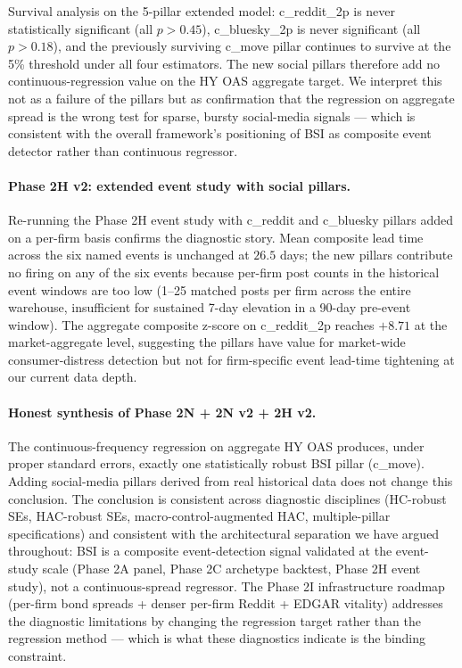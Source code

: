 \documentclass[11pt,a4paper]{article}
\begin{document}
Survival analysis on the 5-pillar extended model: c\_reddit\_2p is never statistically significant (all $p > 0.45$), c\_bluesky\_2p is never significant (all $p > 0.18$), and the previously surviving c\_move pillar continues to survive at the 5\% threshold under all four estimators. The new social pillars therefore add no continuous-regression value on the HY OAS aggregate target. We interpret this not as a failure of the pillars but as confirmation that the regression on aggregate spread is the wrong test for sparse, bursty social-media signals --- which is consistent with the overall framework's positioning of BSI as composite event detector rather than continuous regressor.

\paragraph{Phase 2H v2: extended event study with social pillars.} Re-running the Phase 2H event study with c\_reddit and c\_bluesky pillars added on a per-firm basis confirms the diagnostic story. Mean composite lead time across the six named events is unchanged at $26.5$ days; the new pillars contribute no firing on any of the six events because per-firm post counts in the historical event windows are too low (1--25 matched posts per firm across the entire warehouse, insufficient for sustained 7-day elevation in a 90-day pre-event window). The aggregate composite z-score on c\_reddit\_2p reaches $+8.71$ at the market-aggregate level, suggesting the pillars have value for market-wide consumer-distress detection but not for firm-specific event lead-time tightening at our current data depth.

\paragraph{Honest synthesis of Phase 2N + 2N v2 + 2H v2.} The continuous-frequency regression on aggregate HY OAS produces, under proper standard errors, exactly one statistically robust BSI pillar (c\_move). Adding social-media pillars derived from real historical data does not change this conclusion. The conclusion is consistent across diagnostic disciplines (HC-robust SEs, HAC-robust SEs, macro-control-augmented HAC, multiple-pillar specifications) and consistent with the architectural separation we have argued throughout: BSI is a composite event-detection signal validated at the event-study scale (Phase 2A panel, Phase 2C archetype backtest, Phase 2H event study), not a continuous-spread regressor. The Phase 2I infrastructure roadmap (per-firm bond spreads + denser per-firm Reddit + EDGAR vitality) addresses the diagnostic limitations by changing the regression target rather than the regression method --- which is what these diagnostics indicate is the binding constraint.
\end{document}
